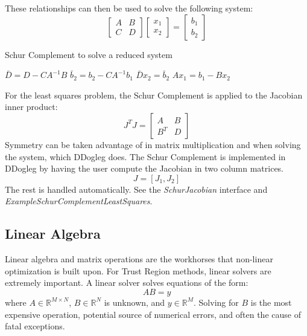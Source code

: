\documentclass[peerreview,compsoc,onecolumn]{IEEEtran}
\newcommand{\R}{\mathbb{R}}
\begin{document}
These relationships can then be used to solve the following system:
\begin{equation}
\begin{bmatrix}
A & B \\
C & D
\end{bmatrix}
\begin{bmatrix}
x_1 \\ x_2
\end{bmatrix}
=
\begin{bmatrix}
b_1 \\ b_2
\end{bmatrix}
\end{equation}

\begin{algorithm}{}
\caption{\label{alg:schur_complement}Schur Complement to solve a reduced system}
\begin{algorithmic}[1]
	\State $\bar{D} = D - C A^{-1} B$
	\State $\bar{b}_2 = b_2 - C A^{-1} b_1$  
	\State $\bar{D} x_2 = \bar{b}_2$         
	\State $A x_1 = b_1 - B x_2$
\end{algorithmic}
\end{algorithm}

For the least squares problem, the Schur Complement is applied to the Jacobian inner product:
\begin{equation}
J^T J =
\begin{bmatrix}
A & B \\
B^T & D
\end{bmatrix}
\end{equation}
Symmetry can be taken advantage of in matrix multiplication and when solving the system, which DDogleg does. The Schur Complement is implemented in DDogleg by having the user compute the Jacobian in two column matrices.
\begin{equation}
J = [ J_1 , J_2 ]
\end{equation}
The rest is handled automatically. See the \emph{SchurJacobian} interface and \emph{ExampleSchurComplementLeastSquares}.

\subsection{Linear Algebra}

Linear algebra and matrix operations are the workhorses that non-linear optimization is built upon. For Trust Region methods, linear solvers are extremely important. A linear solver solves equations of the form:
\begin{equation}
AB = y
\end{equation}
where $A \in \R^{M \times N}$, $B \in \R^N$ is unknown, and $y \in \R^M$. Solving for $B$ is the most expensive operation, potential source of numerical errors, and often the cause of fatal exceptions.
\end{document}
